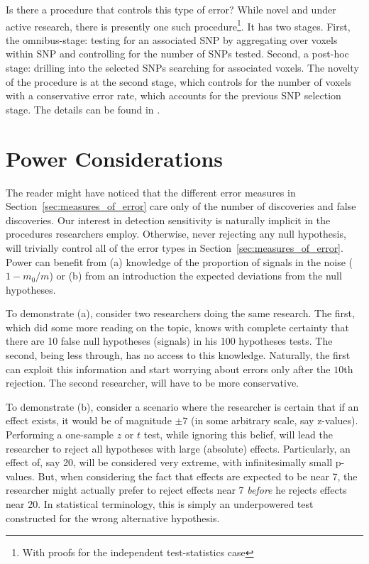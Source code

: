\documentclass[review,12pt]{article}
\begin{document}
Is there a procedure that controls this type of error? While novel and under active research, there is presently one such procedure\footnote{ With proofs for the independent test-statistics case}. It has two stages. 
First, the omnibus-stage:  testing for an associated SNP by aggregating over voxels within SNP and controlling for the number of SNPs tested. Second, a post-hoc stage: drilling into the selected SNPs searching for associated voxels. The novelty of the procedure is at the second stage, which controls for the number of voxels with a conservative error rate, which accounts for the previous SNP selection stage. 
The details can be found in \cite{benjamini_adjusting_2013}.




\section{\label{sec:power}Power Considerations}

The reader might have noticed that the different error measures in Section~\ref{sec:measures_of_error} care only of the number of discoveries and false discoveries. Our interest in detection sensitivity is naturally implicit in the procedures researchers employ. Otherwise, never rejecting any null hypothesis, will trivially control all of the error types in Section~\ref{sec:measures_of_error}. 
Power can benefit from (a) knowledge of the proportion of signals in the noise ($ 1 - m_0 / m $) or (b) from an introduction the expected deviations from the null hypotheses. 

To demonstrate (a), consider two researchers doing the same research. The first, which did some more reading on the topic, knows with complete certainty that there are 10 false null hypotheses (signals) in his 100 hypotheses tests. The second, being less through, has no access to this knowledge. Naturally, the first can exploit this information and start worrying about errors only after the $10$th rejection. The second researcher, will have to be more conservative.

To demonstrate (b), consider a scenario where the researcher is certain that if an effect exists, it would be of magnitude $\pm 7$ (in some arbitrary scale, say z-values). Performing a one-sample $z$ or $t$ test, while ignoring this belief, will lead the researcher to reject all hypotheses with large (absolute) effects. Particularly, an effect of, say 20,  will be considered very extreme, with infinitesimally small p-values. But, when considering the fact that effects are expected to be near 7, the researcher might actually prefer to reject effects near 7 \emph{before} he rejects effects near 20. In  statistical terminology, this is simply an underpowered test constructed for the wrong alternative hypothesis. 
\end{document}
